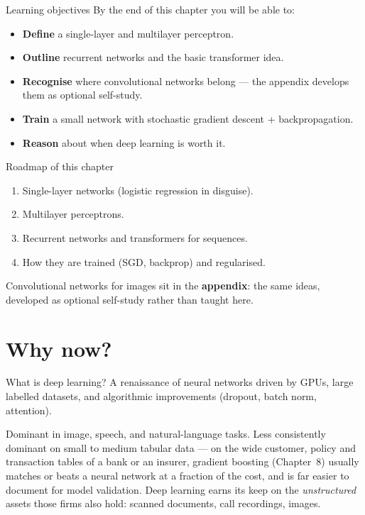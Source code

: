 \documentclass[aspectratio=169,11pt]{beamer}
\begin{document}
\begin{frame}{Learning objectives}
  By the end of this chapter you will be able to:
  \begin{itemize}
    \item \textbf{Define} a single-layer and multilayer perceptron.
    \item \textbf{Outline} recurrent networks and the basic
          transformer idea.
    \item \textbf{Recognise} where convolutional networks belong ---
          the appendix develops them as optional self-study.
    \item \textbf{Train} a small network with stochastic gradient
          descent + backpropagation.
    \item \textbf{Reason} about when deep learning is worth it.
  \end{itemize}
\end{frame}


\begin{frame}{Roadmap of this chapter}
  \begin{takeaway}
    \begin{enumerate}
      \item Single-layer networks (logistic regression in disguise).
      \item Multilayer perceptrons.
      \item Recurrent networks and transformers for sequences.
      \item How they are trained (SGD, backprop) and regularised.
    \end{enumerate}
    Convolutional networks for images sit in the \textbf{appendix}: the same
    ideas, developed as optional self-study rather than taught here.
  \end{takeaway}
\end{frame}

\section{Why now?}

\begin{frame}{What is deep learning?}
  A renaissance of neural networks driven by GPUs, large labelled
  datasets, and algorithmic improvements (dropout, batch norm,
  attention).
  \begin{takeaway}
    Dominant in image, speech, and natural-language tasks. Less
    consistently dominant on small to medium tabular data --- on the wide
    customer, policy and transaction tables of a bank or an insurer,
    gradient boosting (Chapter~8) usually matches or beats a neural network
    at a fraction of the cost, and is far easier to document for model
    validation. Deep learning earns its keep on the \emph{unstructured}
    assets those firms also hold: scanned documents, call recordings, images.
  \end{takeaway}
\end{frame}
\end{document}
